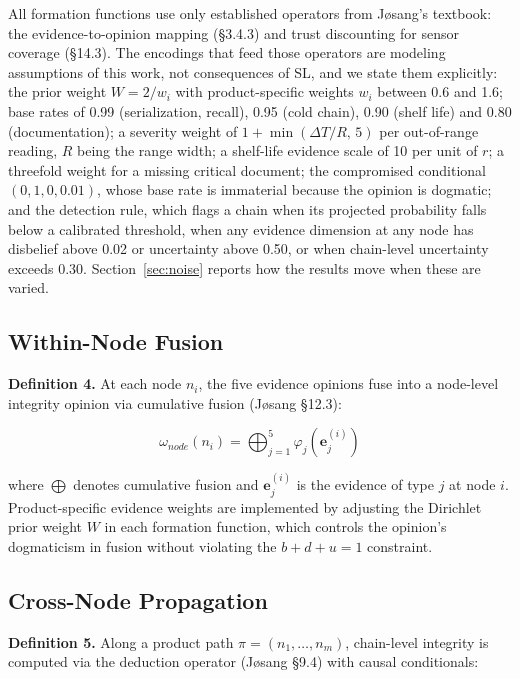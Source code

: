 \documentclass[conference]{IEEEtran}
\begin{document}
All formation functions use only established operators from J\o sang's
textbook: the evidence-to-opinion mapping (\S3.4.3) and trust discounting
for sensor coverage (\S14.3). The encodings that feed those operators are
modeling assumptions of this work, not consequences of SL, and we state
them explicitly: the prior weight $W = 2/w_i$ with product-specific
weights $w_i$ between 0.6 and 1.6; base rates of 0.99 (serialization,
recall), 0.95 (cold chain), 0.90 (shelf life) and 0.80 (documentation);
a severity weight of $1 + \min(\Delta T / R,\, 5)$ per out-of-range
reading, $R$ being the range width; a shelf-life evidence scale of 10
per unit of $r$; a threefold weight for a missing critical document; the
compromised conditional $(0, 1, 0, 0.01)$, whose base rate is immaterial
because the opinion is dogmatic; and the detection rule, which flags a
chain when its projected probability falls below a calibrated threshold,
when any evidence dimension at any node has disbelief above 0.02 or
uncertainty above 0.50, or when chain-level uncertainty exceeds 0.30.
Section~\ref{sec:noise} reports how the results move when these are
varied.

\subsection{Within-Node Fusion}

\textbf{Definition 4.} At each node $n_i$, the five evidence opinions
fuse into a node-level integrity opinion via cumulative fusion
(J\o sang \S12.3):

\begin{equation}
\omega_{node}(n_i) = \bigoplus_{j=1}^{5} \varphi_j(\mathbf{e}_j^{(i)})
\label{eq:node_fusion}
\end{equation}

\noindent where $\bigoplus$ denotes cumulative fusion and
$\mathbf{e}_j^{(i)}$ is the evidence of type $j$ at node $i$.
Product-specific evidence weights are implemented by adjusting the
Dirichlet prior weight $W$ in each formation function, which controls
the opinion's dogmaticism in fusion without violating the
$b + d + u = 1$ constraint.

\subsection{Cross-Node Propagation}

\textbf{Definition 5.} Along a product path $\pi = (n_1, \ldots, n_m)$,
chain-level integrity is computed via the deduction operator (J\o sang
\S9.4) with causal conditionals:
\end{document}
